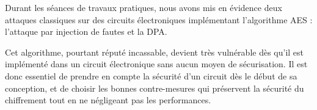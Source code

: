 Durant les séances de travaux pratiques, nous avons mis en évidence
deux attaques classiques sur des circuits électroniques implémentant
l'algorithme AES : l'attaque par injection de fautes et la DPA.

Cet algorithme, pourtant réputé incassable, devient très vulnérable
dès qu'il est implémenté dans un circuit électronique sans aucun moyen 
de sécurisation.
Il est donc essentiel de prendre en compte la sécurité d'un circuit
dès le début de sa conception, et de choisir les bonnes contre-mesures
qui préservent la sécurité du chiffrement tout en ne négligeant pas
les performances.